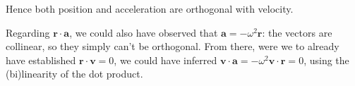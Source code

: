 \documentclass[solutions.tex]{subfiles}
\begin{document}
Hence both position and acceleration are orthogonal with velocity.

\begin{remark} Regarding $\bm{r}\cdot\bm{a}$, we could also have
observed that $\bm{a} = -\omega^2\bm{r}$: the vectors are collinear,
so they simply can't be orthogonal. From there, were we to
already have established $\bm{r}\cdot\bm{v}=0$, we could have
inferred $\bm{v}\cdot\bm{a}=-\omega^2\bm{v}\cdot\bm{r}=0$, using
the (bi)linearity of the dot product.
\end{remark}
\end{document}
